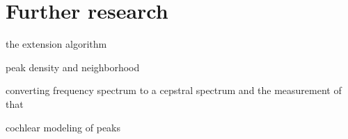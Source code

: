 
\chapter{Further research} %

the extension algorithm

peak density and neighborhood

converting frequency spectrum to a cepstral spectrum and the measurement of that

cochlear modeling of peaks



\ifpdf
    \graphicspath{{X/figures/PNG/}{X/figures/PDF/}{X/figures/}}
\else
    \graphicspath{{X/figures/EPS/}{X/figures/}}
\fi









